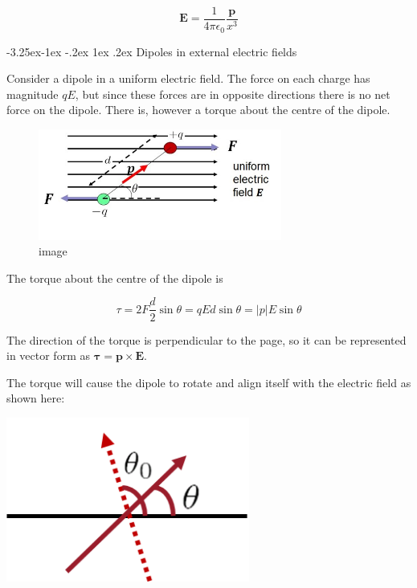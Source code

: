 \documentclass[
]{book}
\makeatletter
\renewcommand\subsection{%
\@startsection{subsection}{2}{\z@}%
              {-3.25ex\@plus -1ex \@minus -.2ex}%
              {1ex \@plus .2ex}%
              {\sffamily\bfseries}}
\numberwithin{equation}{section}
\makeatother
\begin{document}
\begin{equation}
\label{eq:EvsP}
\mathbf{E} = \frac{1}{4\pi \epsilon_0} \frac{\mathbf{p}}{x^3}
\end{equation}

\hypertarget{dipoles-in-external-electric-fields}{%
\subsection{Dipoles in external electric fields}\label{dipoles-in-external-electric-fields}}

Consider a dipole in a uniform electric field. The force on each charge
has magnitude \(qE\), but since these forces are in opposite directions
there is no net force on the dipole. There is, however a torque about
the centre of the dipole.

\begin{figure}
\centering
\includegraphics[width=80mm,height=\textheight]{Figures/dipole_extE.jpg}
\caption{image}
\end{figure}

The torque about the centre of the dipole is

\begin{equation}
\label{eq:torqueDipole}
\tau = 2 F \frac{d}{2} \sin\theta = q E d \sin\theta = |p|E \sin\theta
\end{equation}

The direction of the torque is perpendicular to the page, so it can be
represented in vector form as \(\boldsymbol{\tau} = \mathbf{p} \times \mathbf{E}\).

The torque will cause the dipole to rotate and align itself with the
electric field as shown here:

\includegraphics[width=80mm,height=\textheight]{Figures/dipole_align.png} \protect\hypertarget{fig:diAlign}{}{}
\end{document}
